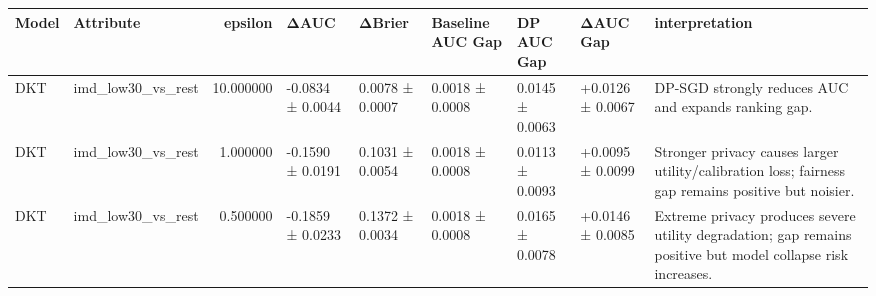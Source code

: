 \begin{tabular}{llrllllll}
\toprule
Model & Attribute & epsilon & ΔAUC & ΔBrier & Baseline AUC Gap & DP AUC Gap & ΔAUC Gap & interpretation \\
\midrule
DKT & imd_low30_vs_rest & 10.000000 & -0.0834 ± 0.0044 & 0.0078 ± 0.0007 & 0.0018 ± 0.0008 & 0.0145 ± 0.0063 & +0.0126 ± 0.0067 & DP-SGD strongly reduces AUC and expands ranking gap. \\
DKT & imd_low30_vs_rest & 1.000000 & -0.1590 ± 0.0191 & 0.1031 ± 0.0054 & 0.0018 ± 0.0008 & 0.0113 ± 0.0093 & +0.0095 ± 0.0099 & Stronger privacy causes larger utility/calibration loss; fairness gap remains positive but noisier. \\
DKT & imd_low30_vs_rest & 0.500000 & -0.1859 ± 0.0233 & 0.1372 ± 0.0034 & 0.0018 ± 0.0008 & 0.0165 ± 0.0078 & +0.0146 ± 0.0085 & Extreme privacy produces severe utility degradation; gap remains positive but model collapse risk increases. \\
\bottomrule
\end{tabular}
